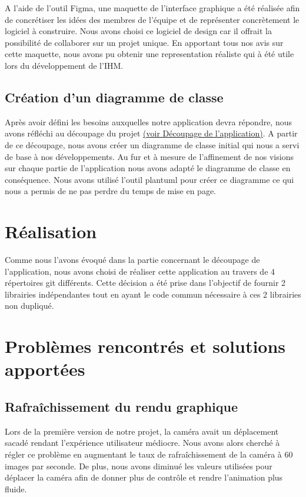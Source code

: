 \documentclass[11pt]{report}
\begin{document}
A l'aide de l'outil Figma, une maquette de l'interface graphique a été réalisée afin de concrétiser les idées des membres de l'équipe
et de représenter concrètement le logiciel à construire. Nous avons choisi ce logiciel de design car il offrait la possibilité de
collaborer sur un projet unique. En apportant tous nos avis sur cette maquette, nous avons pu obtenir une representation réaliste qui à
été utile lors du développement de l'IHM.

\subsection{Création d'un diagramme de classe}

Après avoir défini les besoins auxquelles notre application devra répondre, nous avons réfléchi au découpage du projet \hyperlink{découpage}{(voir Découpage de l'application)}.
A partir de ce découpage, nous avons créer un diagramme de classe initial qui nous a servi de base à nos développements. 
Au fur et à mesure de l'affinement de nos visions sur chaque partie de l'application nous avons adapté le diagramme de classe en conséquence.
Nous avons utilisé l'outil plantuml pour créer ce diagramme ce qui nous a permis de ne pas perdre du temps de mise en page. 

\section{Réalisation}

Comme nous l'avons évoqué dans la partie concernant le découpage de l'application, nous avons choisi de réaliser cette application au travers de 4 répertoires git différents. Cette décision a été prise dans l'objectif de fournir 2 librairies indépendantes tout en ayant le code commun nécessaire à ces 2 librairies non dupliqué.\newline


\section{Problèmes rencontrés et solutions apportées}

\subsection{Rafraîchissement du rendu graphique}

Lors de la première version de notre projet, la caméra avait un déplacement sacadé rendant l'expérience utilisateur médiocre. Nous avons alors
cherché à régler ce problème en augmentant le taux de rafraîchissement de la caméra à 60 images par seconde. De plus, nous avons diminué
les valeurs utilisées pour déplacer la caméra afin de donner plus de contrôle et rendre l'animation plus fluide.
\end{document}
